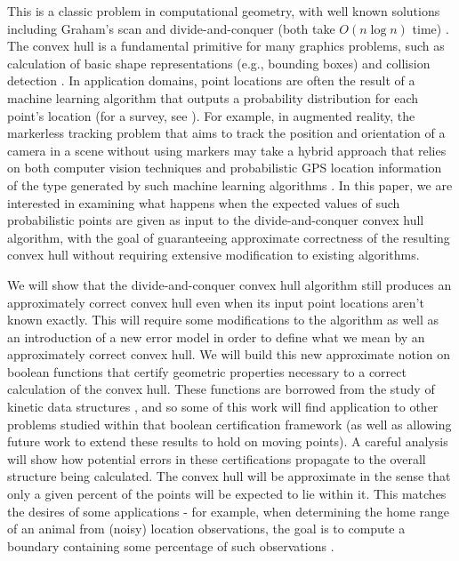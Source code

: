 \documentclass[11pt]{article}
\begin{document}
This is a classic problem in computational geometry, with well known solutions including Graham's scan and divide-and-conquer (both take $O(n \log n)$ time) \cite{cgbook, ORourke1998book}.  The convex hull is a fundamental primitive for many graphics problems, such as calculation of basic shape representations (e.g., bounding boxes) \cite{imageProcBook2014} and collision detection \cite{collisionDetection2001}.  In application domains, point locations are often the result of a machine learning algorithm that outputs a probability distribution for each point's location (for a survey, see \cite{Hightower01Location}).  For example, in augmented reality, the markerless tracking problem that aims to track the position and orientation of a camera in a scene without using markers may take a hybrid approach that relies on both computer vision techniques and probabilistic GPS location information of the type generated by such machine learning algorithms \cite{augrealitySurvey2008}.  In this paper, we are interested in examining what happens when the expected values of such probabilistic points are given as input to the divide-and-conquer convex hull algorithm, with the goal of guaranteeing approximate correctness of the resulting convex hull without requiring extensive modification to existing algorithms.

We will show that the divide-and-conquer convex hull algorithm still produces an approximately correct convex hull even when its input point locations aren't known exactly.  This will require some modifications to the algorithm as well as an introduction of a new error model in order to define what we mean by an approximately correct convex hull.  We will build this new approximate notion on boolean functions that certify geometric properties necessary to a correct calculation of the convex hull.  These functions are borrowed from the study of kinetic data structures \cite{Basch99MobileData}, and so some of this work will find application to other problems studied within that boolean certification framework (as well as allowing future work to extend these results to hold on moving points).  A careful analysis will show how potential errors in these certifications propagate to the overall structure being calculated.  The convex hull will be approximate in the sense that only a given percent of the points will be expected to lie within it.  This matches the desires of some applications - for example, when determining the home range of an animal from (noisy) location observations, the goal is to compute a boundary containing some percentage of such observations \cite{animalHomeRanges2010}.
\end{document}
